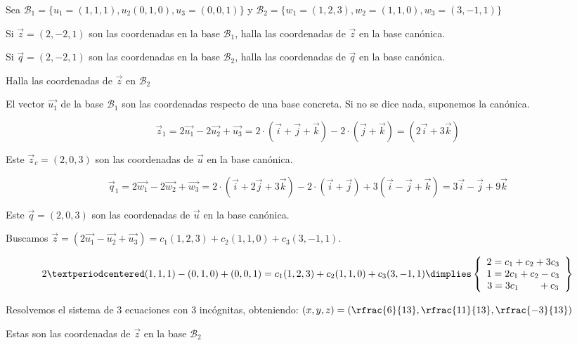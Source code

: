 \begin{problem}

Sea 
$\mathcal{B}_1 = \{ u_1=(1,1,1), u_2(0,1,0), u_3=(0,0,1)\}$
y
$\mathcal{B}_2 = \{ w_1=(1,2,3), w_2=(1,1,0), w_3=(3,-1,1)\}$

\ppart Si $\vec{z} = (2,-2,1)$ son las coordenadas en la base $\mathcal{B}_1$, halla las coordenadas de $\vec{z}$ en la base canónica.


\ppart Si $\vec{q} = (2,-2,1)$ son las coordenadas en la base $\mathcal{B}_2$, halla las coordenadas de $\vec{q}$ en la base canónica.


\ppart Halla las coordenadas de $\vec{z}$ en $\mathcal{B}_2$

\obs El vector $\vec{u_1}$ de la base $\mathcal{B}_1$ son las coordenadas respecto de una base concreta. 
%
Si no se dice nada, suponemos la canónica.

\solution

\spart
\[\vec{z}_1 = 2\vec{u_1} -2\vec{u_2} + \vec{u_3} = 2·(\vec{i} +\vec{j} + \vec{k}) - 2·(\vec{j} + \vec{k}) = (2\vec{i}+3\vec{k})\]

Este $\vec{z}_c = (2,0,3)$ son las coordenadas de $\vec{u}$ en la base canónica.


\spart 

\[
\vec{q}_1 = 2\vec{w_1} -2\vec{w_2} + \vec{w_3} = 
2·(\vec{i} +2\vec{j} + 3\vec{k}) - 2·(\vec{i}+\vec{j}) + 3(\vec{i} -\vec{j} + \vec{k}) = 
3\vec{i} -\vec{j} + 9\vec{k}
\]

Este $\vec{q} = (2,0,3)$ son las coordenadas de $\vec{u}$ en la base canónica.

\spart
Buscamos 
$\vec{z} = (2\vec{u_1}-\vec{u_2}+\vec{u_3}) = c_1(1,2,3) + c_2 (1,1,0) + c_3 ( 3,-1,1)$.

\[
2·(1,1,1) - (0,1,0) + (0,0,1) = c_1(1,2,3) + c_2 (1,1,0) + c_3 ( 3,-1,1)\dimplies \left\{
  \begin{array}{c}
    2 = c_1 + c_2 + 3c_3\\
    1 = 2c_1 + c_2 -c_3\\
    3 = 3c_1  \quad\quad +c_3 
  \end{array}
  \right\}
\]

Resolvemos el sistema de 3 ecuaciones con 3 incógnitas, obteniendo: $(x,y,z) = \left(\rfrac{6}{13},\rfrac{11}{13},\rfrac{-3}{13}\right)$

Estas son las coordenadas de $\vec{z}$ en la base $\mathcal{B}_2$

\end{problem}

